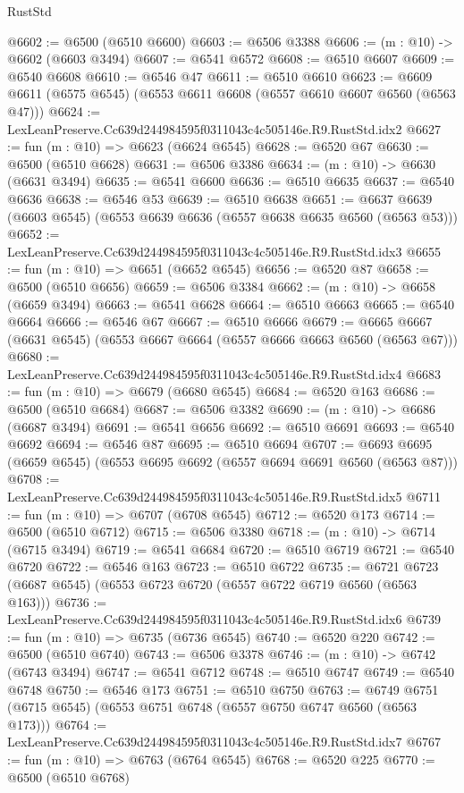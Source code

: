 \begin{lexlean}{RustStd}
\begin{coremodule}
@6602 := @6500 (@6510 @6600)
@6603 := @6506 @3388
@6606 := (m : @10) -> @6602 (@6603 @3494)
@6607 := @6541 @6572
@6608 := @6510 @6607
@6609 := @6540 @6608
@6610 := @6546 @47
@6611 := @6510 @6610
@6623 := @6609 @6611 (@6575 @6545) (@6553 @6611 @6608 (@6557 @6610 @6607 @6560 (@6563 @47)))
@6624 := LexLeanPreserve.Cc639d244984595f0311043c4c505146e.R9.RustStd.idx2
@6627 := fun (m : @10) => @6623 (@6624 @6545)
@6628 := @6520 @67
@6630 := @6500 (@6510 @6628)
@6631 := @6506 @3386
@6634 := (m : @10) -> @6630 (@6631 @3494)
@6635 := @6541 @6600
@6636 := @6510 @6635
@6637 := @6540 @6636
@6638 := @6546 @53
@6639 := @6510 @6638
@6651 := @6637 @6639 (@6603 @6545) (@6553 @6639 @6636 (@6557 @6638 @6635 @6560 (@6563 @53)))
@6652 := LexLeanPreserve.Cc639d244984595f0311043c4c505146e.R9.RustStd.idx3
@6655 := fun (m : @10) => @6651 (@6652 @6545)
@6656 := @6520 @87
@6658 := @6500 (@6510 @6656)
@6659 := @6506 @3384
@6662 := (m : @10) -> @6658 (@6659 @3494)
@6663 := @6541 @6628
@6664 := @6510 @6663
@6665 := @6540 @6664
@6666 := @6546 @67
@6667 := @6510 @6666
@6679 := @6665 @6667 (@6631 @6545) (@6553 @6667 @6664 (@6557 @6666 @6663 @6560 (@6563 @67)))
@6680 := LexLeanPreserve.Cc639d244984595f0311043c4c505146e.R9.RustStd.idx4
@6683 := fun (m : @10) => @6679 (@6680 @6545)
@6684 := @6520 @163
@6686 := @6500 (@6510 @6684)
@6687 := @6506 @3382
@6690 := (m : @10) -> @6686 (@6687 @3494)
@6691 := @6541 @6656
@6692 := @6510 @6691
@6693 := @6540 @6692
@6694 := @6546 @87
@6695 := @6510 @6694
@6707 := @6693 @6695 (@6659 @6545) (@6553 @6695 @6692 (@6557 @6694 @6691 @6560 (@6563 @87)))
@6708 := LexLeanPreserve.Cc639d244984595f0311043c4c505146e.R9.RustStd.idx5
@6711 := fun (m : @10) => @6707 (@6708 @6545)
@6712 := @6520 @173
@6714 := @6500 (@6510 @6712)
@6715 := @6506 @3380
@6718 := (m : @10) -> @6714 (@6715 @3494)
@6719 := @6541 @6684
@6720 := @6510 @6719
@6721 := @6540 @6720
@6722 := @6546 @163
@6723 := @6510 @6722
@6735 := @6721 @6723 (@6687 @6545) (@6553 @6723 @6720 (@6557 @6722 @6719 @6560 (@6563 @163)))
@6736 := LexLeanPreserve.Cc639d244984595f0311043c4c505146e.R9.RustStd.idx6
@6739 := fun (m : @10) => @6735 (@6736 @6545)
@6740 := @6520 @220
@6742 := @6500 (@6510 @6740)
@6743 := @6506 @3378
@6746 := (m : @10) -> @6742 (@6743 @3494)
@6747 := @6541 @6712
@6748 := @6510 @6747
@6749 := @6540 @6748
@6750 := @6546 @173
@6751 := @6510 @6750
@6763 := @6749 @6751 (@6715 @6545) (@6553 @6751 @6748 (@6557 @6750 @6747 @6560 (@6563 @173)))
@6764 := LexLeanPreserve.Cc639d244984595f0311043c4c505146e.R9.RustStd.idx7
@6767 := fun (m : @10) => @6763 (@6764 @6545)
@6768 := @6520 @225
@6770 := @6500 (@6510 @6768)

\end{coremodule}
\end{lexlean}
